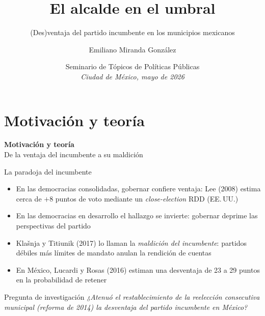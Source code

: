 \documentclass[
  aspectratio=43,        %
  t,                     %
  10pt                   %
]{beamer}
\author[E. Miranda]{Emiliano Miranda González}
\institute[ITAM]{%
  Instituto Tecnológico Autónomo de México\\
  Departamento Académico de Ciencia Política\\[0.4em]
  {\fontfamily{cmtt}\selectfont
   \href{mailto:emiliano.miranda@itam.mx}{emiliano.miranda@itam.mx}}%
}
\title[Reelección e incumbencia]{El alcalde en el umbral}
\subtitle{(Des)ventaja del partido incumbente en los municipios mexicanos}
\date{%
  Seminario de Tópicos de Políticas Públicas\\[0.2em]
  \textit{Ciudad de México, mayo de 2026}%
}
\begin{document}

{
\begin{frame}
  \titlepage
\end{frame}
}

\section{Motivación y teoría}
{
\begin{frame}
  \vfill
  \begin{center}
    \textcolor{ITAMgreen}{\Large\bfseries Motivación y teoría}\\[0.5em]
    \textcolor{ITAMgray}{\normalsize De la ventaja del incumbente a su maldición}
  \end{center}
  \vfill
\end{frame}
}

\begin{frame}{La paradoja del incumbente}

  \begin{itemize}
    \item En las democracias consolidadas, gobernar confiere ventaja: Lee (2008)
          estima cerca de \textcolor{ITAMgreen}{$+8$ puntos} de voto mediante un
          \emph{close-election} RDD (EE.\,UU.)
    \item En las democracias en desarrollo el hallazgo se invierte: gobernar
          \textcolor{ITAMmaroon}{deprime} las perspectivas del partido
    \item Klašnja y Titiunik (2017) lo llaman la \emph{maldición del incumbente}:
          partidos débiles más límites de mandato anulan la rendición de cuentas
    \item En México, Lucardi y Rosas (2016) estiman una desventaja de
          \textcolor{ITAMmaroon}{23 a 29 puntos} en la probabilidad de retener
  \end{itemize}

  \vspace{0.4em}
  \begin{block}{Pregunta de investigación}
    \textit{¿Atenuó el restablecimiento de la reelección consecutiva municipal
    (reforma de 2014) la desventaja del partido incumbente en México?}
  \end{block}

\end{frame}
\end{document}
